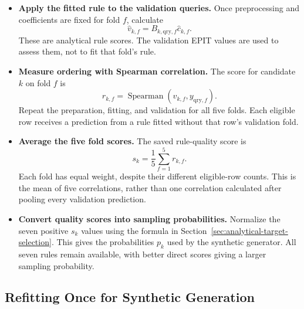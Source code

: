 \documentclass[11pt]{article}
\newenvironment{notes}
  {\begin{itemize}\setlength{\itemsep}{0.45em}\setlength{\parsep}{0pt}}
  {\end{itemize}}
\begin{document}
\begin{notes}
    \item \textbf{Apply the fitted rule to the validation queries.}
    Once preprocessing and coefficients are fixed for fold \(f\),
    calculate
    \[
        \widehat v_{k,f}
        =B_{k,\mathrm{qry},f}\widehat c_{k,f}.
    \]
    These are analytical rule scores. The validation EPIT
    values are used to assess them, not to fit that fold's rule.

    \item \textbf{Measure ordering with Spearman correlation.}
    The score for candidate \(k\) on fold \(f\) is
    \[
        r_{k,f}
        =
        \operatorname{Spearman}
        \!\left(\widehat v_{k,f},y_{\mathrm{qry},f}\right).
    \]
    Repeat the preparation, fitting, and validation for all
    five folds. Each eligible row receives a prediction from
    a rule fitted without that row's validation fold.

    \item \textbf{Average the five fold scores.}
    The saved rule-quality score is
    \begin{equation}
        s_k=\frac{1}{5}\sum_{f=1}^{5}r_{k,f}.
        \label{eq:rule-quality}
    \end{equation}
    Each fold has equal weight, despite their different
    eligible-row counts. This is the mean of five correlations,
    rather than one correlation calculated after pooling
    every validation prediction.

    \item \textbf{Convert quality scores into sampling probabilities.}
    Normalize the seven positive \(s_k\) values using the
    formula in Section~\ref{sec:analytical-target-selection}.
    This gives the probabilities \(p_k\) used by the synthetic
    generator. All seven rules remain available, with better
    direct scores giving a larger sampling probability.
\end{notes}

\subsection{Refitting Once for Synthetic Generation}
\label{sec:final-rule-refit}
\end{document}
